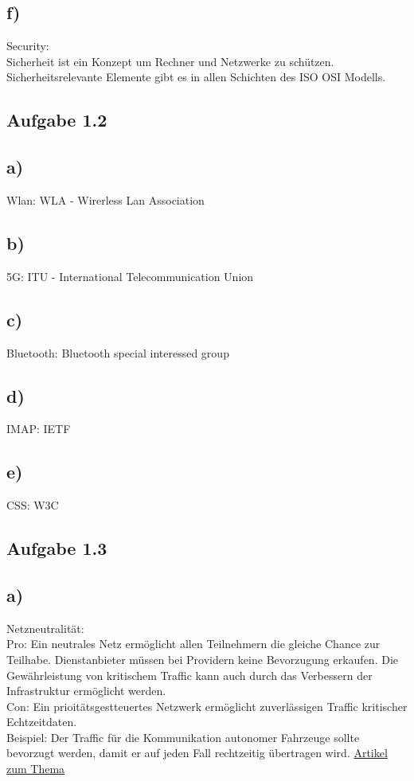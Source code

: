 \documentclass{article}
\begin{document}
	\subsection*{f)}
	Security: \\
	Sicherheit ist ein Konzept um Rechner und Netzwerke zu schützen. \\
	Sicherheitsrelevante Elemente gibt es in allen Schichten des ISO OSI Modells.
	\subsection*{Aufgabe 1.2}
	\subsection*{a)}
	Wlan: WLA - Wirerless Lan Association
	\subsection*{b)}
	5G: ITU - International Telecommunication Union
	\subsection*{c)}
	Bluetooth: Bluetooth special interessed group
	\subsection*{d)}
	IMAP: IETF
	\subsection*{e)}
	CSS: W3C
	\subsection*{Aufgabe 1.3}
	\subsection*{a)}
	Netzneutralität: \\
	Pro: Ein neutrales Netz ermöglicht allen Teilnehmern die gleiche Chance zur Teilhabe. Dienstanbieter müssen bei Providern keine Bevorzugung erkaufen. Die Gewährleistung von kritischem Traffic kann auch durch das Verbessern der Infrastruktur ermöglicht werden.\\
	Con: Ein prioitätsgestteuertes  Netzwerk ermöglicht zuverlässigen Traffic kritischer Echtzeitdaten. \\
	Beispiel: Der Traffic für die Kommunikation autonomer Fahrzeuge sollte bevorzugt werden, damit er auf jeden Fall rechtzeitig übertragen wird.
	\href{https://www.spiegel.de/netzwelt/netzpolitik/eu-leitlinie-zur-netzneutralitaet-deshalb-ist-die-verordnung-so-wichtig-a-1109899.html}{Artikel zum Thema}
\end{document}
